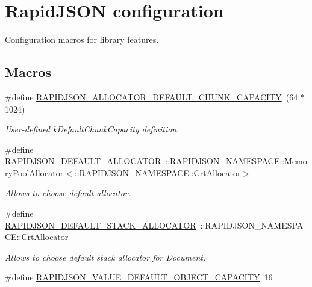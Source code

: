 \hypertarget{group__RAPIDJSON__CONFIG}{}\section{Rapid\+J\+S\+ON configuration}
\label{group__RAPIDJSON__CONFIG}


Configuration macros for library features.  


\subsection*{Macros}
\begin{DoxyCompactItemize}
\item 
\#define \hyperlink{group__RAPIDJSON__CONFIG_ga860570d04d489be08b9835d2ec58bac5}{R\+A\+P\+I\+D\+J\+S\+O\+N\+\_\+\+A\+L\+L\+O\+C\+A\+T\+O\+R\+\_\+\+D\+E\+F\+A\+U\+L\+T\+\_\+\+C\+H\+U\+N\+K\+\_\+\+C\+A\+P\+A\+C\+I\+TY}~(64 $\ast$ 1024)
\begin{DoxyCompactList}\small\item\em User-\/defined k\+Default\+Chunk\+Capacity definition. \end{DoxyCompactList}\item 
\#define \hyperlink{group__RAPIDJSON__CONFIG_ga04a88f0b2db9091006eb7fc6deb6077b}{R\+A\+P\+I\+D\+J\+S\+O\+N\+\_\+\+D\+E\+F\+A\+U\+L\+T\+\_\+\+A\+L\+L\+O\+C\+A\+T\+OR}~\+::R\+A\+P\+I\+D\+J\+S\+O\+N\+\_\+\+N\+A\+M\+E\+S\+P\+A\+C\+E\+::\+Memory\+Pool\+Allocator$<$\+::R\+A\+P\+I\+D\+J\+S\+O\+N\+\_\+\+N\+A\+M\+E\+S\+P\+A\+C\+E\+::\+Crt\+Allocator$>$
\begin{DoxyCompactList}\small\item\em Allows to choose default allocator. \end{DoxyCompactList}\item 
\#define \hyperlink{group__RAPIDJSON__CONFIG_ga1178cffff7c596922a5ed3fda30c5520}{R\+A\+P\+I\+D\+J\+S\+O\+N\+\_\+\+D\+E\+F\+A\+U\+L\+T\+\_\+\+S\+T\+A\+C\+K\+\_\+\+A\+L\+L\+O\+C\+A\+T\+OR}~\+::R\+A\+P\+I\+D\+J\+S\+O\+N\+\_\+\+N\+A\+M\+E\+S\+P\+A\+C\+E\+::\+Crt\+Allocator
\begin{DoxyCompactList}\small\item\em Allows to choose default stack allocator for Document. \end{DoxyCompactList}\item 
\#define \hyperlink{group__RAPIDJSON__CONFIG_ga5c88aa612939b592d15d3fc4bdf54272}{R\+A\+P\+I\+D\+J\+S\+O\+N\+\_\+\+V\+A\+L\+U\+E\+\_\+\+D\+E\+F\+A\+U\+L\+T\+\_\+\+O\+B\+J\+E\+C\+T\+\_\+\+C\+A\+P\+A\+C\+I\+TY}~16

\end{DoxyCompactItemize}
